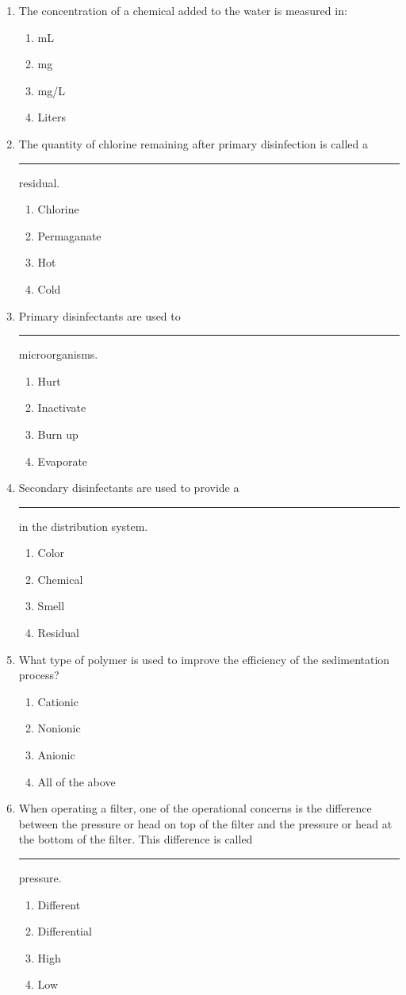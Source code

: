 \begin{enumerate}
\item The concentration of a chemical added to the water is measured in:
\begin{enumerate}
\item mL
\item mg
\item mg/L
\item Liters
\end{enumerate}

\item The quantity of chlorine remaining after primary disinfection is called a
\rule{1cm}{0.5pt}  residual.
\begin{enumerate}
\item Chlorine
\item Permaganate
\item Hot
\item Cold
\end{enumerate}

\item Primary disinfectants are used to \rule{1cm}{0.5pt}  microorganisms.
\begin{enumerate}
\item Hurt
\item Inactivate
\item Burn up
\item Evaporate
\end{enumerate}

\item Secondary disinfectants are used to provide a \rule{1cm}{0.5pt}  in the distribution system.
\begin{enumerate}
\item Color
\item Chemical
\item Smell
\item Residual
\end{enumerate}

\item What type of polymer is used to improve the efficiency of the sedimentation
process?
\begin{enumerate}
\item Cationic
\item Nonionic
\item Anionic
\item All of the above
\end{enumerate}

\item When operating a filter, one of the operational concerns is the difference between the pressure or head on top of the filter and the pressure or head at the bottom of the filter. This difference is called \rule{1cm}{0.5pt}  pressure.
\begin{enumerate}
\item Different
\item Differential
\item High
\item Low
\end{enumerate}


\end{enumerate}
